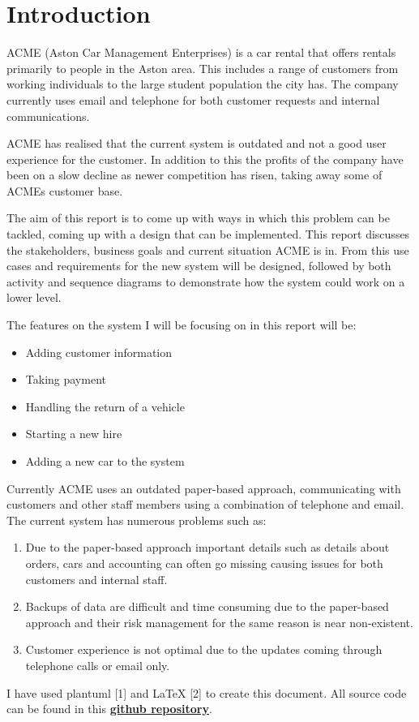 \section{Introduction}
ACME (Aston Car Management Enterprises) is a car rental that offers rentals primarily to people in the Aston area.
This includes a range of customers from working individuals to the large student population the city has. The company currently uses email and telephone
for both customer requests and internal communications. 

ACME has realised that the current system is outdated and not a good user experience for the customer. In addition to this the 
profits of the company have been on a slow decline as newer competition has risen, taking away some of ACMEs customer base. 

The aim of this report is to come up with ways in which this problem can be tackled, coming up with a design that can be implemented. This report
discusses the stakeholders, business goals and current situation ACME is in. From this use cases and requirements for the new system will be designed,
followed by both activity and sequence diagrams to demonstrate how the system could work on a lower level.

The features on the system I will be focusing on in this report will be:
\begin{itemize}
  \item Adding customer information
  \item Taking payment
  \item Handling the return of a vehicle
  \item Starting a new hire
  \item Adding a new car to the system
\end{itemize}

Currently ACME uses an outdated paper-based approach, communicating with customers and other staff members using a combination of telephone and email.
The current system has numerous problems such as: 
\begin{enumerate}
  \item Due to the paper-based approach important details such as details about orders, cars and accounting can often go missing causing issues 
  for both customers and internal staff.
  \item Backups of data are difficult and time consuming due to the paper-based approach and their risk management for the same reason is near non-existent.
  \item Customer experience is not optimal due to the updates coming through telephone calls or email only.
\end{enumerate}

\vspace{0.2cm}

I have used plantuml [1] and LaTeX [2] to create this document. All source code can be found in this
\href{https://github.com/OMBowkerBBC/DC4600-Assignment1}{\textbf{github repository}}.

\newpage
